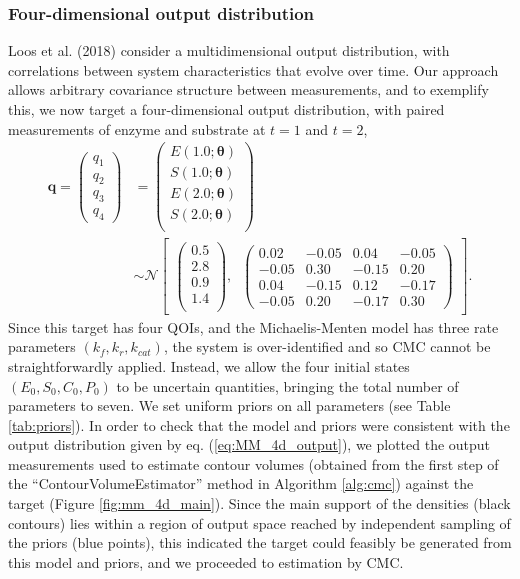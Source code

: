 \subsubsection{Four-dimensional output distribution}\label{sec:4D}
Loos et al. (2018) consider a multidimensional output distribution, with correlations between system characteristics that evolve over time. Our approach allows arbitrary covariance structure between measurements, and to exemplify this, we now target a four-dimensional output distribution, with paired measurements of enzyme and substrate at $t=1$ and $t=2$,
%
\begin{equation}\label{eq:MM_4d_output}
\begin{aligned}
\boldsymbol{q} = \begin{pmatrix} q_1 \\ q_2 \\ q_3 \\ q_4 \end{pmatrix} &=
\begin{pmatrix}
E(1.0; \boldsymbol{\theta})\\
S(1.0; \boldsymbol{\theta})\\
E(2.0; \boldsymbol{\theta})\\
S(2.0; \boldsymbol{\theta})\\
\end{pmatrix}
\\
&\sim  \mathcal{N}
\begin{bmatrix}
\begin{pmatrix}
0.5\\
2.8\\
0.9\\
1.4\\
\end{pmatrix}, \;\;
\begin{pmatrix}
0.02 &  -0.05 &  0.04 & -0.05\\
-0.05 & 0.30  & -0.15 & 0.20\\
0.04 & -0.15  & 0.12  &  -0.17\\
-0.05 & 0.20 & -0.17 & 0.30
\end{pmatrix}
\end{bmatrix}.
\end{aligned}
\end{equation}
%
Since this target has four QOIs, and the Michaelis-Menten model has three rate parameters $(k_f,k_r,k_{cat})$, the system is over-identified and so CMC cannot be straightforwardly applied. Instead, we allow the four initial states $(E_0, S_0, C_0, P_0)$ to be uncertain quantities, bringing the total number of parameters to seven. We set uniform priors on all parameters (see Table \ref{tab:priors}). In order to check that the model and priors were consistent with the output distribution given by eq. (\ref{eq:MM_4d_output}), we plotted the output measurements used to estimate contour volumes (obtained from the first step of the ``ContourVolumeEstimator'' method in Algorithm \ref{alg:cmc}) against the target (Figure \ref{fig:mm_4d_main}). Since the main support of the densities (black contours) lies within a region of output space reached by independent sampling of the priors (blue points), this indicated the target could feasibly be generated from this model and priors, and we proceeded to estimation by CMC.


